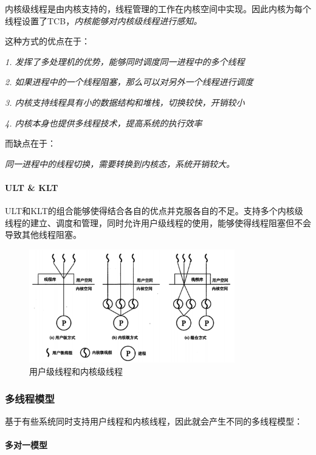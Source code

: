     内核级线程是由内核支持的，线程管理的工作在内核空间中实现。因此内核为每个线程设置了TCB，\emph{\color{red}内核能够对内核级线程进行感知。}

    这种方式的优点在于：

    \emph{1. 发挥了多处理机的优势，能够同时调度同一进程中的多个线程}

    \emph{2. 如果进程中的一个线程阻塞，那么可以对另外一个线程进行调度}

    \emph{3. 内核支持线程具有小的数据结构和堆栈，切换较快，开销较小}

    \emph{4. 内核本身也提供多线程技术，提高系统的执行效率}

    而缺点在于：

    \emph{同一进程中的线程切换，需要转换到内核态，系统开销较大。}

\paragraph{ULT \& KLT}

    ULT和KLT的组合能够使得结合各自的优点并克服各自的不足。支持多个内核级线程的建立、调度和管理，同时允许用户级线程的使用，能够使得线程阻塞但不会导致其他线程阻塞。

\begin{figure}[!htbp]
    \centering
    \includegraphics[width=0.8\textwidth]{image/chapter02/用户级线程和内核级线程.png}
    \caption{用户级线程和内核级线程}
\end{figure}

\subsubsection{多线程模型}

    基于有些系统同时支持用户线程和内核线程，因此就会产生不同的多线程模型：

\paragraph{多对一模型}

